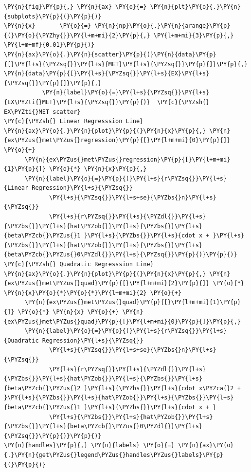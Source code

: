 \documentclass[10pt]{article}\usepackage[]{graphicx}\usepackage[]{xcolor}
\begin{document}
    \begin{Verbatim}[commandchars=\\\{\}]
\PY{n}{fig}\PY{p}{,} \PY{n}{ax} \PY{o}{=} \PY{n}{plt}\PY{o}{.}\PY{n}{subplots}\PY{p}{(}\PY{p}{)}
\PY{n}{x}       \PY{o}{=} \PY{n}{np}\PY{o}{.}\PY{n}{arange}\PY{p}{(}\PY{o}{\PYZhy{}}\PY{l+m+mi}{2}\PY{p}{,} \PY{l+m+mi}{3}\PY{p}{,} \PY{l+m+mf}{0.01}\PY{p}{)}
\PY{n}{ax}\PY{o}{.}\PY{n}{scatter}\PY{p}{(}\PY{n}{data}\PY{p}{[}\PY{l+s}{\PYZsq{}}\PY{l+s}{MET}\PY{l+s}{\PYZsq{}}\PY{p}{]}\PY{p}{,} \PY{n}{data}\PY{p}{[}\PY{l+s}{\PYZsq{}}\PY{l+s}{EX}\PY{l+s}{\PYZsq{}}\PY{p}{]}\PY{p}{,}
           \PY{n}{label}\PY{o}{=}\PY{l+s}{\PYZsq{}}\PY{l+s}{EX\PYZti{}MET}\PY{l+s}{\PYZsq{}}\PY{p}{)}  \PY{c}{\PYZsh{} EX\PYZti{}MET scatter}
\PY{c}{\PYZsh{} Linear Regresssion Line}
\PY{n}{ax}\PY{o}{.}\PY{n}{plot}\PY{p}{(}\PY{n}{x}\PY{p}{,} \PY{n}{ex\PYZus{}met\PYZus{}regression}\PY{p}{[}\PY{l+m+mi}{0}\PY{p}{]} \PY{o}{+} 
      \PY{n}{ex\PYZus{}met\PYZus{}regression}\PY{p}{[}\PY{l+m+mi}{1}\PY{p}{]} \PY{o}{*} \PY{n}{x}\PY{p}{,}
      \PY{n}{label}\PY{o}{=}\PY{p}{(}\PY{l+s}{r\PYZsq{}}\PY{l+s}{Linear Regression}\PY{l+s}{\PYZsq{}}
             \PY{l+s}{\PYZsq{}}\PY{l+s+se}{\PYZbs{}n}\PY{l+s}{\PYZsq{}}
             \PY{l+s}{r\PYZsq{}}\PY{l+s}{\PYZdl{}}\PY{l+s}{\PYZbs{}}\PY{l+s}{hat\PYZob{}}\PY{l+s}{\PYZbs{}}\PY{l+s}{beta\PYZcb{}\PYZus{}1 }\PY{l+s}{\PYZbs{}}\PY{l+s}{cdot x + }\PY{l+s}{\PYZbs{}}\PY{l+s}{hat\PYZob{}}\PY{l+s}{\PYZbs{}}\PY{l+s}{beta\PYZcb{}\PYZus{}0\PYZdl{}}\PY{l+s}{\PYZsq{}}\PY{p}{)}\PY{p}{)}
\PY{c}{\PYZsh{} Quadratic Regresssion Line}
\PY{n}{ax}\PY{o}{.}\PY{n}{plot}\PY{p}{(}\PY{n}{x}\PY{p}{,} \PY{n}{ex\PYZus{}met\PYZus{}quad}\PY{p}{[}\PY{l+m+mi}{2}\PY{p}{]} \PY{o}{*} \PY{n}{x}\PY{o}{*}\PY{o}{*}\PY{l+m+mi}{2} \PY{o}{+}
      \PY{n}{ex\PYZus{}met\PYZus{}quad}\PY{p}{[}\PY{l+m+mi}{1}\PY{p}{]} \PY{o}{*} \PY{n}{x} \PY{o}{+} \PY{n}{ex\PYZus{}met\PYZus{}quad}\PY{p}{[}\PY{l+m+mi}{0}\PY{p}{]}\PY{p}{,}
      \PY{n}{label}\PY{o}{=}\PY{p}{(}\PY{l+s}{r\PYZsq{}}\PY{l+s}{Quadratic Regression}\PY{l+s}{\PYZsq{}}
             \PY{l+s}{\PYZsq{}}\PY{l+s+se}{\PYZbs{}n}\PY{l+s}{\PYZsq{}}
             \PY{l+s}{r\PYZsq{}}\PY{l+s}{\PYZdl{}}\PY{l+s}{\PYZbs{}}\PY{l+s}{hat\PYZob{}}\PY{l+s}{\PYZbs{}}\PY{l+s}{beta\PYZcb{}\PYZus{}2 }\PY{l+s}{\PYZbs{}}\PY{l+s}{cdot x\PYZca{}2 + }\PY{l+s}{\PYZbs{}}\PY{l+s}{hat\PYZob{}}\PY{l+s}{\PYZbs{}}\PY{l+s}{beta\PYZcb{}\PYZus{}1 }\PY{l+s}{\PYZbs{}}\PY{l+s}{cdot x + }
             \PY{l+s}{\PYZbs{}}\PY{l+s}{hat\PYZob{}}\PY{l+s}{\PYZbs{}}\PY{l+s}{beta\PYZcb{}\PYZus{}0\PYZdl{}}\PY{l+s}{\PYZsq{}}\PY{p}{)}\PY{p}{)}
\PY{n}{handles}\PY{p}{,} \PY{n}{labels} \PY{o}{=} \PY{n}{ax}\PY{o}{.}\PY{n}{get\PYZus{}legend\PYZus{}handles\PYZus{}labels}\PY{p}{(}\PY{p}{)}

\end{Verbatim}
\end{document}
